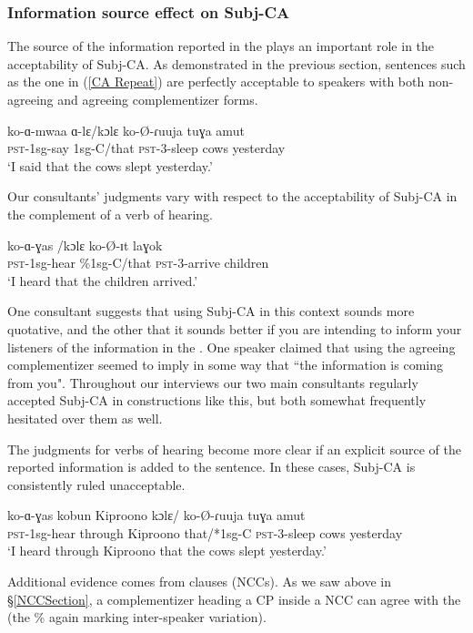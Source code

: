 \documentclass[output=paper
,newtxmath
,modfonts
,nonflat]{langsci/langscibook}
\begin{document}
\subsubsection{Information source effect on Subj-CA}

The source of the information reported in the  plays an important role in the acceptability of Subj-CA. As demonstrated in the previous section, sentences such as the one in (\ref{CA Repeat}) are perfectly acceptable to speakers with both non-agreeing and agreeing complementizer forms.

\ea \label{CA Repeat}
\gll	ko-ɑ-mwaa ɑ-lɛ/kɔlɛ ko-\O-ɾuuja tuɣa amut \\
\textsc{pst}-1sg-say 1sg-C/that \textsc{pst}-3-sleep cows yesterday \\
\glt `I said that the cows slept yesterday.'
\z

\noindent Our consultants' judgments vary with respect to the acceptability of Subj-CA in the complement of a verb of hearing.  

\ea
\gll ko-ɑ-ɣas /kɔlɛ ko-\O-ɪt laɣok \\
\textsc{pst}-1sg-hear \%1sg-C/that \textsc{pst}-3-arrive children \\
\glt `I heard that the children arrived.'
\z

\noindent One consultant suggests that using Subj-CA in this context sounds more quotative, and the other that it sounds better if you are intending to inform your listeners of the information in the . One speaker claimed that using the agreeing complementizer seemed to imply in some way that ``the information is coming from you". Throughout our interviews our two main consultants regularly accepted Subj-CA in constructions like this, but both somewhat frequently hesitated over them as well. 

The judgments for verbs of hearing become more clear if an explicit source of the reported information is added to the sentence. In these cases, Subj-CA is consistently ruled unacceptable.  

\ea 
\gll ko-ɑ-ɣas kobun Kiproono kɔlɛ/ ko-\O-ɾuuja tuɣa amut \\
\textsc{pst}-1sg-hear through Kiproono that/*1sg-C \textsc{pst}-3-sleep cows yesterday \\
\trans `I heard through Kiproono that the cows slept yesterday.' 
\z

Additional evidence comes from  clauses (NCCs). As we saw above in \S \ref{NCCSection}, a complementizer heading a CP inside a NCC can agree with the   (the \% again marking inter-speaker variation). 
\end{document}
